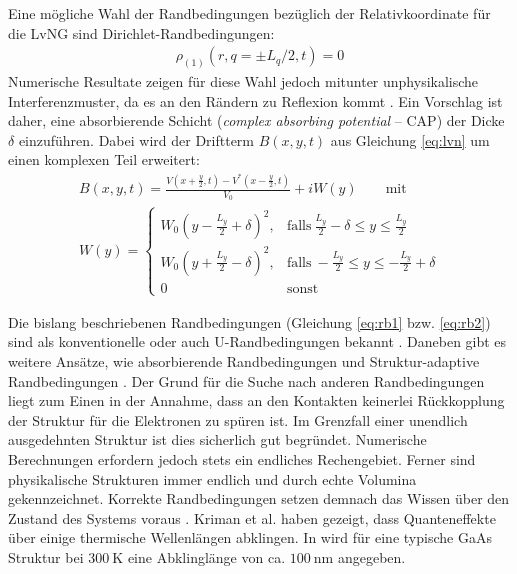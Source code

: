 Eine mögliche Wahl der Randbedingungen bezüglich der Relativkoordinate für die LvNG sind Dirichlet-Randbedingungen:
\begin{equation}
  \begin{aligned}
    \rho_{(1)}(r, q=\pm L_q/2, t) = 0
  \end{aligned}
  \label{eq:rb3}
\end{equation}
Numerische Resultate zeigen für diese Wahl jedoch mitunter unphysikalische Interferenzmuster, da es an den Rändern zu Reflexion kommt \cite{lukas1}. Ein Vorschlag ist daher, eine absorbierende Schicht (\emph{complex absorbing potential} -- CAP) der Dicke $\delta$ einzuführen. Dabei wird der Driftterm $B(x,y,t)$ aus Gleichung \eqref{eq:lvn} um einen komplexen Teil erweitert:
\begin{equation}
  \begin{aligned}
    B(x,y,t) = \frac{V\left(x+\frac{y}{2},t\right) - V^*\left(x-\frac{y}{2},t\right)}{V_0} + iW(y) \qquad \text{mit} \\
  W(y)=
  \begin{cases}
  W_0 \left(y-\frac{L_y}{2}+\delta \right)^2, & \text{falls}~\frac{L_y}{2}-\delta \le y \le \frac{L_y}{2}\\
  W_0 \left(y+\frac{L_y}{2}-\delta \right)^2, & \text{falls}~-\frac{L_y}{2} \le y \le -\frac{L_y}{2}+\delta\\
  0 & \text{sonst}
  \end{cases}
  \end{aligned}
  \label{eq:cap}
\end{equation}

Die bislang beschriebenen Randbedingungen (Gleichung \eqref{eq:rb1} bzw. \eqref{eq:rb2}) sind als konventionelle oder auch U-Randbedingungen bekannt \cite{failure}. Daneben gibt es weitere Ansätze, wie absorbierende Randbedingungen \cite{arnold1994absorbing, lukas2, lukas1} und Struktur-adaptive Randbedingungen \cite{jiang2014device}. Der Grund für die Suche nach anderen Randbedingungen liegt zum Einen in der Annahme, dass an den Kontakten keinerlei Rückkopplung der Struktur  für die Elektronen zu spüren ist. Im Grenzfall einer unendlich ausgedehnten Struktur ist dies sicherlich gut begründet. Numerische Berechnungen erfordern jedoch stets ein endliches Rechengebiet. Ferner sind physikalische Strukturen immer endlich und durch echte Volumina gekennzeichnet. Korrekte Randbedingungen setzen demnach das Wissen über den Zustand des Systems voraus \cite{ringhofer}.
Kriman et al. \cite{kriman1987scattering} haben gezeigt, dass Quanteneffekte über einige thermische Wellenlängen abklingen. In \cite{ringhofer} wird für eine typische GaAs Struktur bei $\SI{300}{\kelvin}$ eine Abklinglänge von ca. $\SI{100}{\nano\meter}$ angegeben.

